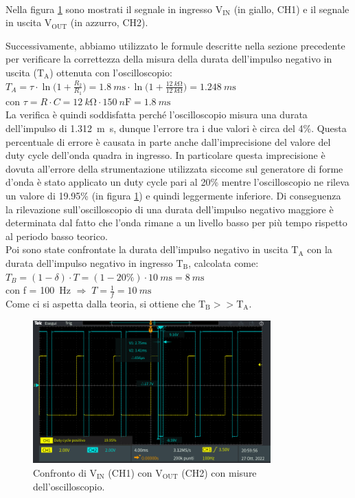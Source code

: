 \documentclass{report}
\begin{document}
\\\indent Nella figura \ref{figura:TEK00002} sono mostrati il segnale in ingresso $\mathrm{V_{IN}}$ (in giallo, CH1) e il segnale in uscita $\mathrm{V_{OUT}}$ (in azzurro, CH2).\par
Successivamente, abbiamo utilizzato le formule descritte nella sezione precedente per verificare la correttezza della misura della durata dell'impulso negativo in uscita ($\mathrm{T_A}$) ottenuta con l'oscilloscopio:
\\[4pt]\indent$\displaystyle{T_A=\tau\cdot\ln\biggl(1+\frac{R_2}{R_1}\biggr)=\SI{1.8}{m\second}\cdot\ln\biggl(1+\frac{\SI{12}{k\ohm}}{\SI{12}{k\ohm}}\biggr)=\SI{1.248}{m\second}}$
\\[4pt]\indent con $\displaystyle{\tau=R \cdot C=\SI{12}{k\ohm}\cdot\SI{150}{n\farad}=\SI{1.8}{m\second}}$
\\[4pt]La verifica è quindi soddisfatta perché l'oscilloscopio misura una durata dell'impulso di \SI{1.312}{m\second}, dunque l'errore tra i due valori è circa del 4\%. Questa percentuale di errore è causata in parte anche dall'imprecisione del valore del duty cycle dell'onda quadra in ingresso. In particolare questa imprecisione è dovuta all'errore della strumentazione utilizzata siccome sul generatore di forme d'onda è stato applicato un duty cycle pari al 20\% mentre l'oscilloscopio ne rileva un valore di 19.95\% (in figura \ref{figura:TEK00002}) e quindi leggermente inferiore. Di conseguenza la rilevazione sull'oscilloscopio di una durata dell'impulso negativo maggiore è determinata dal fatto che l'onda rimane a un livello basso per più tempo rispetto al periodo basso teorico.
\\Poi sono state confrontate la durata dell'impulso negativo in uscita $\mathrm{T_A}$ con la durata dell'impulso negativo in ingresso $\mathrm{T_B}$, calcolata come:
\\[4pt]\indent$\displaystyle{T_B=(1-\delta)\cdot T=(1-20\%)\cdot\SI{10}{m\second}=\SI{8}{m\second}}$
\\[4pt]\indent con f = \SI{100}{\hertz} $\Rightarrow\;\displaystyle{T=\frac{1}{f}=\SI{10}{m\second}}$
\\[4pt]Come ci si aspetta dalla teoria, si ottiene che $\mathrm{T_B}>>\mathrm{T_A}$.
\begin{figure}[h]
	\centering
	\includegraphics[height=5.5cm]{immagini/TEK00002}
	\caption{Confronto di $\mathrm{V_{IN}}$ (CH1) con $\mathrm{V_{OUT}}$ (CH2) con misure dell'oscilloscopio.}
	\label{figura:TEK00002}
\end{figure}
\end{document}
